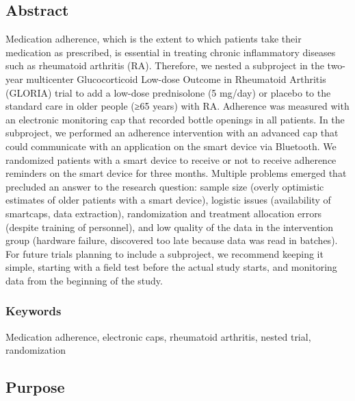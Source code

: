 \documentclass{article}
\begin{document}
\subsection{Abstract }

Medication adherence, which is the extent to which patients take their medication as prescribed, is essential in treating chronic inflammatory diseases such as rheumatoid arthritis (RA). Therefore, we nested a subproject in the two-year multicenter Glucocorticoid Low-dose Outcome in Rheumatoid Arthritis (GLORIA) trial to add a low-dose prednisolone (5 mg/day) or placebo to the standard care in older people (≥65 years) with RA. Adherence was measured with an electronic monitoring cap that recorded bottle openings in all patients. In the subproject, we performed an adherence intervention with an advanced cap that could communicate with an application on the smart device via Bluetooth. We randomized patients with a smart device to receive or not to receive adherence reminders on the smart device for three months. Multiple problems emerged that precluded an answer to the research question: sample size (overly optimistic estimates of older patients with a smart device), logistic issues (availability of smartcaps, data extraction), randomization and treatment allocation errors (despite training of personnel), and low quality of the data in the intervention group (hardware failure, discovered too late because data was read in batches). For future trials planning to include a subproject, we recommend keeping it simple, starting with a field test before the actual study starts, and monitoring data from the beginning of the study. 



\subsubsection{Keywords}

Medication adherence, electronic caps, rheumatoid arthritis, nested trial, randomization 



\subsection{Purpose }
\end{document}

